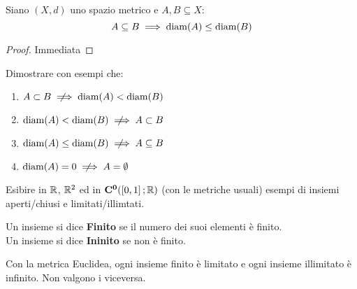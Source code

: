 \begin{proposition}
	Siano $(X,d)$ uno spazio metrico e $A,B\subseteq X$:
	\[A \subseteq B \implies \operatorname{diam}(A) \leq \operatorname{diam}(B)\]
	\begin{proof}
		Immediata %
	\end{proof}
\end{proposition}
\begin{exercise}
	Dimostrare con esempi che:
	\begin{enumerate}
		\item $A \subset B \notimplies \diam(A) < \diam(B)$
		\item $\diam(A) < \diam(B) \notimplies A \subset B$
		\item $\diam(A) \leq \diam(B) \notimplies A \subseteq B$
		\item $\diam(A) = 0 \notimplies A = \emptyset$ %
	\end{enumerate}
\end{exercise}
\begin{exercise}
	Esibire in $\mathbb{R}$, $\mathbb{R}^2$ ed in $\mathbf{C^{0}}(\left[0,1\right]; \mathbb{R})$ (con le metriche usuali) esempi di insiemi aperti/chiusi e limitati/illimtati.
\end{exercise}

\begin{definition}
	Un insieme si dice \textbf{Finito} se il numero dei suoi elementi è finito.\\
	Un insieme si dice \textbf{Ininito} se non è finito.
\end{definition}
\begin{observation}
	Con la metrica Euclidea, ogni insieme finito è limitato e ogni insieme illimitato è infinito. Non valgono i viceversa.
\end{observation}

